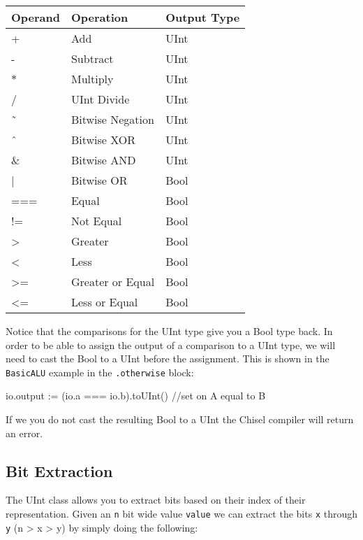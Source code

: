 \documentclass[twocolumn, 10pt]{article}
\begin{document}
\begin{center}
	\begin{tabular}{| l | l | l | }
	\hline
	Operand & Operation & Output Type \\ \hline
	+ & Add & UInt  \\ \hline
	- & Subtract & UInt  \\ \hline
	$\ast$ & Multiply & UInt \\ \hline
	/ & UInt Divide & UInt \\ \hline
	\~\ & Bitwise Negation & UInt \\ \hline
	\^\ & Bitwise XOR & UInt\\ \hline
	\& & Bitwise AND & UInt \\ \hline
	 | & Bitwise OR & Bool \\ \hline
	=== & Equal & Bool \\ \hline
	!= & Not Equal & Bool \\ \hline
	> & Greater & Bool \\ \hline
	< & Less & Bool \\ \hline
	>= & Greater or Equal & Bool \\ \hline
	<= & Less or Equal & Bool \\ \hline
	\end{tabular}
\end{center}

Notice that the comparisons for the UInt type give you a Bool type back. In order to be able to assign the output of a comparison to a UInt type, we will need to cast the Bool to a UInt before the assignment. This is shown in the \verb+BasicALU+ example in the \verb+.otherwise+ block:

\begin{scala}
io.output :=  (io.a === io.b).toUInt() //set on A equal to B
\end{scala}

If we you do not cast the resulting Bool to a UInt the Chisel compiler will return an error.

\subsection{Bit Extraction}

The UInt class allows you to extract bits based on their index of their representation. Given an \verb+n+ bit wide value \verb+value+ we can extract the bits \verb+x+ through \verb+y+ (n > x > y) by simply doing the following:
\end{document}
